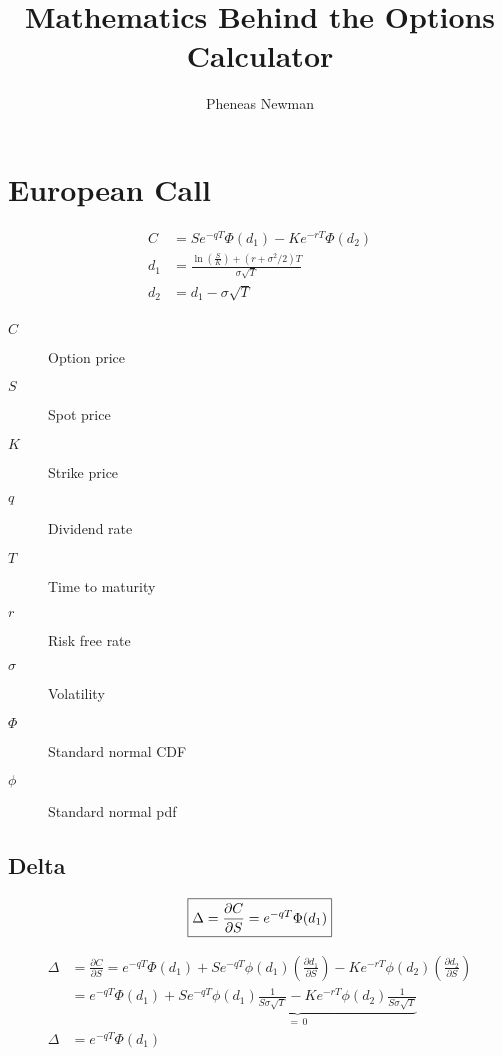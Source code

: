 \documentclass[12pt,a4paper]{article}
\begin{document}
\title{Mathematics Behind the Options Calculator}
\author{Pheneas Newman}
\maketitle

\section{European Call}

\[
\begin{aligned}
    C &= Se^{-qT} \Phi(d_1) - Ke^{-rT} \Phi(d_2) \\
    d_1 &= \frac{\ln\!\left(\tfrac{S}{K}\right) + (r + \sigma^2/2)T}{\sigma \sqrt{T}} \\
    d_2 &= d_1 - \sigma \sqrt{T} \\
\end{aligned}
\]

\begin{description}
  \item[$C$] Option price
  \item[$S$] Spot price
  \item[$K$] Strike price
  \item[$q$] Dividend rate
  \item[$T$] Time to maturity
  \item[$r$] Risk free rate
  \item[$\sigma$] Volatility 
  \item[$\Phi$] Standard normal CDF
  \item[$\phi$] Standard normal pdf 
\end{description}

\subsection{Delta}
\[
\boxed{\Delta = \frac{\partial C}{\partial S} = e^{-qT}\Phi(d_1)} \\
\]

\[
\begin{aligned}  
    \Delta &= \frac{\partial C}{\partial S} = e^{-qT}\Phi(d_1) + Se^{-qT}\phi(d_1)\left(\frac{\partial d_1}{\partial S}\right) - Ke^{-rT}\phi(d_2)\left(\frac{\partial d_2}{\partial S} \right) \\
    &= e^{-qT}\Phi(d_1) + \underbrace{Se^{-qT}\phi(d_1)\frac{1}{S \sigma \sqrt{T}} - Ke^{-rT}\phi(d_2)\frac{1}{S \sigma \sqrt{T}}}_{=\,0}  \\
    \Delta &= e^{-qT}\Phi(d_1)
\end{aligned}
\]
\end{document}
